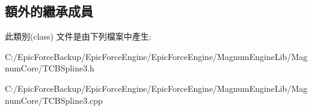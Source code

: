 \subsection*{額外的繼承成員}


此類別(class) 文件是由下列檔案中產生\+:\begin{DoxyCompactItemize}
\item 
C\+:/\+Epic\+Force\+Backup/\+Epic\+Force\+Engine/\+Epic\+Force\+Engine/\+Magnum\+Engine\+Lib/\+Magnum\+Core/T\+C\+B\+Spline3.\+h\item 
C\+:/\+Epic\+Force\+Backup/\+Epic\+Force\+Engine/\+Epic\+Force\+Engine/\+Magnum\+Engine\+Lib/\+Magnum\+Core/T\+C\+B\+Spline3.\+cpp\end{DoxyCompactItemize}
